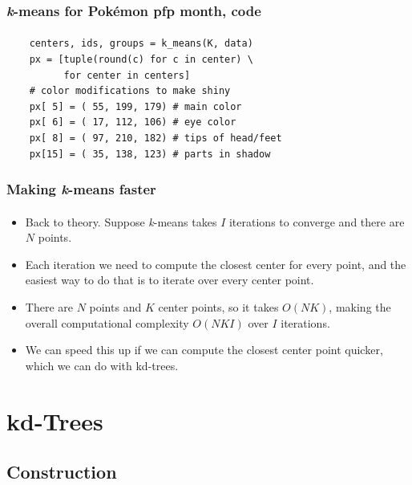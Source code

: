 \documentclass{beamer}                             %
\begin{document}
\begin{frame}[fragile]
\frametitle{\textit{k}-means for Pokémon pfp month, code}
\framesubtitle{}
\begin{verbatim}
    centers, ids, groups = k_means(K, data)
    px = [tuple(round(c) for c in center) \
          for center in centers]
    # color modifications to make shiny
    px[ 5] = ( 55, 199, 179) # main color
    px[ 6] = ( 17, 112, 106) # eye color 
    px[ 8] = ( 97, 210, 182) # tips of head/feet
    px[15] = ( 35, 138, 123) # parts in shadow
\end{verbatim}
\end{frame}

\begin{frame}
\frametitle{Making \textit{k}-means faster}
\framesubtitle{}

\begin{itemize}[<+->]
  \item Back to theory. Suppose \textit{k}-means takes \( I \)
    iterations to converge and there are \( N \) points.
  \item Each iteration we need to compute the closest center for every point,
    and the easiest way to do that is to iterate over every center point.
  \item There are \( N \) points and \( K \) center points,
    so it takes \( O(NK) \), making the overall computational
    complexity \( O(NKI) \) over \( I \) iterations.
  \item We can speed this up if we can compute the closest
    center point quicker, which we can do with \alert{kd-trees}.
\end{itemize}
\end{frame}

\section{kd-Trees}
\subsection{Construction}
\end{document}
